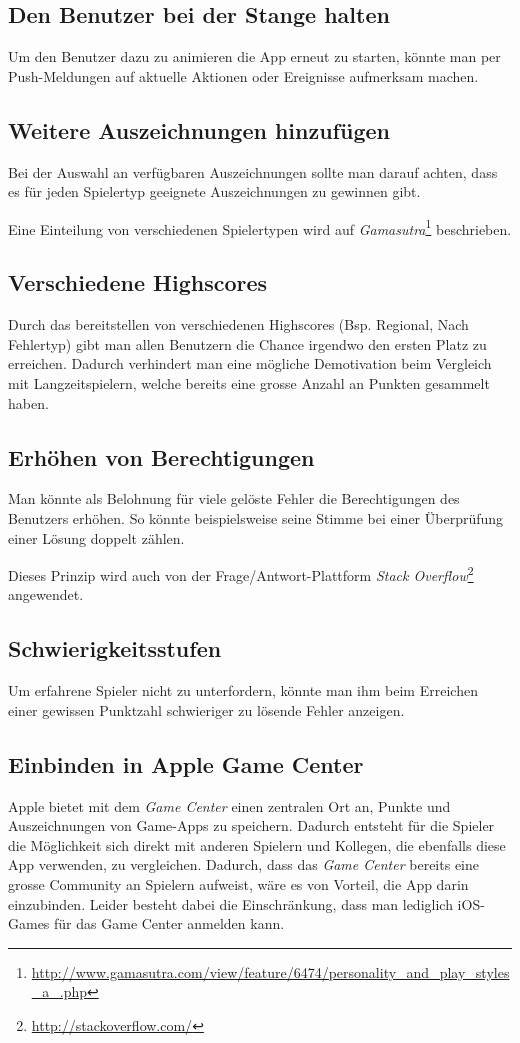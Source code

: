 \subsection{Den Benutzer bei der Stange halten}
Um den Benutzer dazu zu animieren die App erneut zu starten, könnte man per Push-Meldungen auf aktuelle Aktionen oder Ereignisse aufmerksam machen.

\subsection{Weitere Auszeichnungen hinzufügen}
Bei der Auswahl an verfügbaren Auszeichnungen sollte man darauf achten, dass es für jeden Spielertyp geeignete Auszeichnungen zu gewinnen gibt.

Eine Einteilung von verschiedenen Spielertypen wird auf \emph{Gamasutra}\footnote{\url{http://www.gamasutra.com/view/feature/6474/personality_and_play_styles_a_.php}} beschrieben.

\subsection{Verschiedene Highscores}
Durch das bereitstellen von verschiedenen Highscores (Bsp. Regional, Nach Fehlertyp) gibt man allen Benutzern die Chance irgendwo den ersten Platz zu erreichen.
Dadurch verhindert man eine mögliche Demotivation beim Vergleich mit Langzeitspielern, welche bereits eine grosse Anzahl an Punkten gesammelt haben.

\subsection{Erhöhen von Berechtigungen}
Man könnte als Belohnung für viele gelöste Fehler die Berechtigungen des Benutzers erhöhen.
So könnte beispielsweise seine Stimme bei einer Überprüfung einer Lösung doppelt zählen.

Dieses Prinzip wird auch von der Frage/Antwort-Plattform \emph{Stack Overflow}\footnote{\url{http://stackoverflow.com/}} angewendet.

\subsection{Schwierigkeitsstufen}
Um erfahrene Spieler nicht zu unterfordern, könnte man ihm beim Erreichen einer gewissen Punktzahl schwieriger zu lösende Fehler anzeigen.

\subsection{Einbinden in Apple Game Center}
Apple bietet mit dem \emph{Game Center} einen zentralen Ort an, Punkte und Auszeichnungen von Game-Apps zu speichern.
Dadurch entsteht für die Spieler die Möglichkeit sich direkt mit anderen Spielern und Kollegen, die ebenfalls diese App verwenden, zu vergleichen.
Dadurch, dass das \emph{Game Center} bereits eine grosse Community an Spielern aufweist, wäre es von Vorteil, die App darin einzubinden.
Leider besteht dabei die Einschränkung, dass man lediglich iOS-Games für das Game Center anmelden kann.

